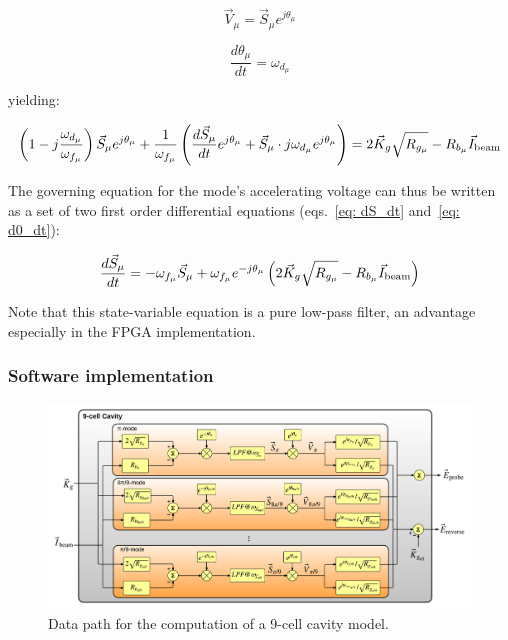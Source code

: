 \documentclass[a4paper,12pt]{article}
\begin{document}
\begin{equation}
\vec{V}_{\mu} = \vec{S}_{\mu}e^{j\theta_{\mu}}
\label{eq:V_mu}
\end{equation}

\begin{equation}
\frac{d\theta_{\mu}}{dt} = \omega_{d_\mu}
\label{eq: d0_dt}
\end{equation}

\noindent yielding:

\begin{equation}
\left(1 - j\frac{\omega_{d_\mu}}{\omega_{f_{\mu}}}\right)\vec{S}_{\mu}e^{j\theta_{\mu}} + \frac{1}{\omega_{f_{\mu}}}
    \left(\frac{d\vec{S}_{\mu}}{dt}e^{j\theta_{\mu}} + \vec{S}_{\mu} \cdot j\omega_{d_{\mu}}e^{j\theta_{\mu}}\right) = 2\vec{K}_{g}\sqrt{R_{g_{\mu}}} - R_{b_{\mu}}\vec{I}_{\rm beam}
\label{eq Gov_S}
\end{equation}

\noindent The governing equation for the mode's accelerating voltage can thus be written as a set of two first order differential equations (eqs.~\ref{eq: dS_dt} and~\ref{eq: d0_dt}):

\begin{equation}
  \frac{d\vec{S}_{\mu}}{dt} = -\omega_{f_{\mu}}\vec{S}_{\mu} + \omega_{f_{\mu}}e^{-j\theta_{\mu}}\left(2\vec{K}_g\sqrt{R_{g_{\mu}}} 
    - R_{b_{\mu}}\vec{I}_{\rm beam} \right)
\label{eq: dS_dt}
\end{equation}

Note that this state-variable equation is a pure low-pass filter, an advantage especially in the FPGA implementation.

\subsubsection{Software implementation}

\begin{figure}
\centering
\includegraphics[scale=0.4]{../figures/Cavity_modes.png}
\caption{Data path for the computation of a 9-cell cavity model.}
\label{fig:RF_cavity_block_diagram}
\end{figure}
\end{document}
